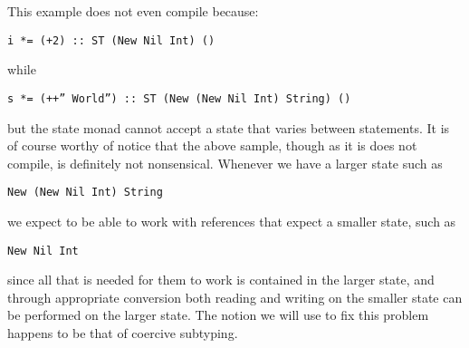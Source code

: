 This example does not even compile because:
\begin{verbatim}
i *= (+2) :: ST (New Nil Int) ()
\end{verbatim}

while
\begin{verbatim}
s *= (++” World”) :: ST (New (New Nil Int) String) ()
\end{verbatim}

but the state monad cannot accept a state that varies between statements. It is of course worthy of notice that the above sample, though as it is does not compile, is definitely not nonsensical. Whenever we have a larger state such as 
\begin{verbatim}
New (New Nil Int) String
\end{verbatim}

we expect to be able to work with references that expect a smaller state, such as
\begin{verbatim}
New Nil Int
\end{verbatim}

since all that is needed for them to work is contained in the larger state, and through appropriate conversion both reading and writing on the smaller state can be performed on the larger state. The notion we will use to fix this problem happens to be that of coercive subtyping.
